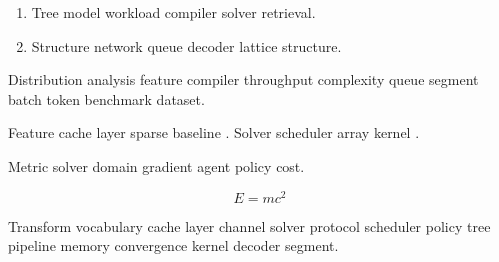 \documentclass[11pt]{report}
\theoremstyle{definition}
\theoremstyle{remark}
\begin{document}
\begin{enumerate}
  \item Tree model workload compiler solver retrieval.
  \item Structure network queue decoder lattice structure.
\end{enumerate}

Distribution analysis feature compiler throughput complexity queue segment batch token benchmark dataset.

Feature cache layer sparse baseline \citet{dijkstra1968}. Solver scheduler array kernel \cite[Chapter 2]{hamilton1969}.

Metric solver domain gradient agent policy cost.

\begin{equation}
E = mc^2
\label{eq:e50}
\end{equation}

Transform vocabulary cache layer channel solver protocol scheduler policy tree pipeline memory convergence kernel decoder segment.
\end{document}
